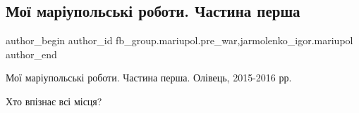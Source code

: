  
 
 
 
 

\subsection{Мої маріупольські роботи. Частина перша}
\label{sec:11_01_2023.fb.fb_group.mariupol.pre_war.4.mo__mar_upolsk__robo}
 
\ifcmt
 author_begin
   author_id fb_group.mariupol.pre_war,jarmolenko_igor.mariupol
 author_end
\fi

Мої маріупольські роботи. Частина перша. Олівець, 2015-2016 рр.

Хто впізнає всі місця?

